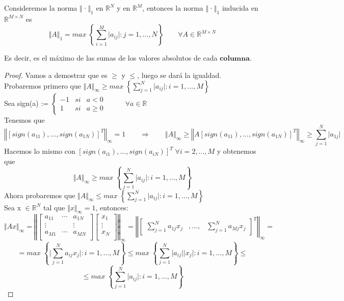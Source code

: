 \begin{nprop}
Consideremos la norma $\Vert$·$\Vert _1$ en $\mathbb{R}^N$ y en $\mathbb{R}^M$, entonces la norma $\Vert$·$\Vert _1$ inducida en $\mathbb{R}^{M \times N}$ es
\[ \Vert A \Vert _1 = max \; \left\lbrace \sum_{i=1}^M \vert a_{ij} \vert : j = 1,...,N \right\rbrace \qquad \forall A \in \mathbb{R}^{M \times N} \]
\end{nprop}

Es decir, es el máximo de las sumas de los valores absolutos de cada $\textbf{columna}$.

\begin{proof} Vamos a demostrar que es $\geq$ y $\leq$, luego se dará la igualdad.\\
Probaremos primero que $ \Vert A \Vert _\infty \geq max \; \left\lbrace \sum_{j=1}^N \vert a_{ij} \vert : i = 1,...,M \right\rbrace $\\
Sea sign(a) := $\left\{ \begin{array}{lcc}
-1 & si & a < 0 \\
1 & si & a \geq 0
\end{array}
\right.$ $\qquad$ $\forall a \in \mathbb{R}$\\
Tenemos que
\[ \left\Vert \left[ sign(a_{11}),...,sign(a_{1N}) \right] ^T \right\Vert _\infty = 1 \qquad \Rightarrow \qquad \Vert A \Vert _\infty \geq \left\Vert A \left[ sign(a_{11}),...,sign(a_{1N}) \right] ^T \right\Vert _\infty \geq \sum_{j=1}^N \vert a_{1j} \vert \]
Hacemos lo mismo con $\left[ sign(a_{i1}),...,sign(a_{iN}) \right] ^T \; \forall i = 2,...,M$ y obtenemos que
\[ \Vert A \Vert _\infty \geq max \; \left\lbrace \sum_{j=1}^N \vert a_{ij} \vert : i = 1,...,M \right\rbrace \]
Ahora probaremos que $ \Vert A \Vert _\infty \leq max \; \left\lbrace \sum_{j=1}^N \vert a_{ij} \vert : i = 1,...,M \right\rbrace $\\
Sea x $\in \mathbb{R}^N$ tal que $\Vert x \Vert _\infty = 1$, entonces:
\[ \Vert Ax \Vert _\infty = \left\Vert
\begin{bmatrix}
a_{11} &  \cdots & a_{1N} \\
\vdots & & \vdots
\\ a_{M1} & \cdots & a_{MN} \\ \end{bmatrix}
\begin{bmatrix}
x_1 \\
\vdots \\
x_N \\
\end{bmatrix}
\right\Vert _\infty = \left\Vert
\begin{bmatrix}
\sum_{j=1}^N a_{1j}x_j & ,\ldots , & \sum_{j=1}^N a_{Mj}x_j
\end{bmatrix} ^T
\right\Vert _\infty = \] \[= max \; \left\lbrace \vert \sum_{j=1}^N a_{ij}x_j \vert : i = 1,...,M \right\rbrace \leq max \; \left\lbrace \sum_{j=1}^N \vert a_{ij} \vert \vert x_j \vert : i = 1,...,M \right\rbrace \leq \] \[ \leq max \; \left\lbrace \sum_{j=1}^N \vert a_{ij} \vert : i = 1,...,M \right\rbrace \]
\end{proof}

